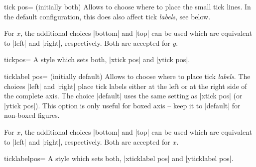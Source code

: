\begin{pgfplotsxykey}{\x tick pos= (initially both)}
Allows to choose where to place the small tick lines. In the default configuration, this does also affect tick \emph{labels}, see below.

For $x$, the additional choices |bottom| and |top| can be used which are equivalent to |left| and |right|, respectively. Both are accepted for $y$.
\end{pgfplotsxykey}

\begin{pgfplotskey}{tickpos=}
	A style which sets both, |xtick pos| and |ytick pos|.
\end{pgfplotskey}

\begin{pgfplotsxykey}{\x ticklabel pos= (initially default)}
Allows to choose where to place tick \emph{labels}. The choices |left| and |right| place tick labels either at the left or at the right side of the complete axis. The choice |default| uses the same setting as |xtick pos| (or |ytick pos|). This option is only useful for boxed axis -- keep it to |default| for non-boxed figures.

For $x$, the additional choices |bottom| and |top| can be used which are equivalent to |left| and |right|, respectively. Both are accepted for $x$.
\end{pgfplotsxykey}

\begin{pgfplotskey}{ticklabelpos=}
	A style which sets both, |xticklabel pos| and |yticklabel pos|.
\end{pgfplotskey}

